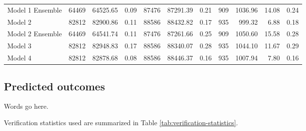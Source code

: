 \documentclass[]{elsarticle} %
\begin{document}
\begin{landscape}
\begin{table}
\begin{tabular}[t]{lrrrrrrrrrr}
\rowcolor{gray!15}
\hspace{1em}Model 1 Ensemble & 64469 & 64525.65 & 0.09 & 87476 & 87291.39 & 0.21 & 909 & 1036.96 & 14.08 & 0.24\\
\hspace{1em}Model 2 & 82812 & 82900.86 & 0.11 & 88586 & 88432.82 & 0.17 & 935 & 999.32 & 6.88 & 0.18\\
\rowcolor{gray!15}
\hspace{1em}Model 2 Ensemble & 64469 & 64541.74 & 0.11 & 87476 & 87261.66 & 0.25 & 909 & 1050.60 & 15.58 & 0.28\\
\hspace{1em}Model 3 & 82812 & 82948.83 & 0.17 & 88586 & 88340.07 & 0.28 & 935 & 1044.10 & 11.67 & 0.29\\
\rowcolor{gray!15}
\hspace{1em}Model 4 & 82812 & 82878.68 & 0.08 & 88586 & 88446.37 & 0.16 & 935 & 1007.94 & 7.80 & 0.16\\
\bottomrule
\end{tabular}
\end{table}
\end{landscape}

\hypertarget{predicted-outcomes}{%
\subsection{Predicted outcomes}\label{predicted-outcomes}}

Words go here.

Verification statistics used are summarized in Table
\ref{tab:verification-statistics}.
\end{document}
